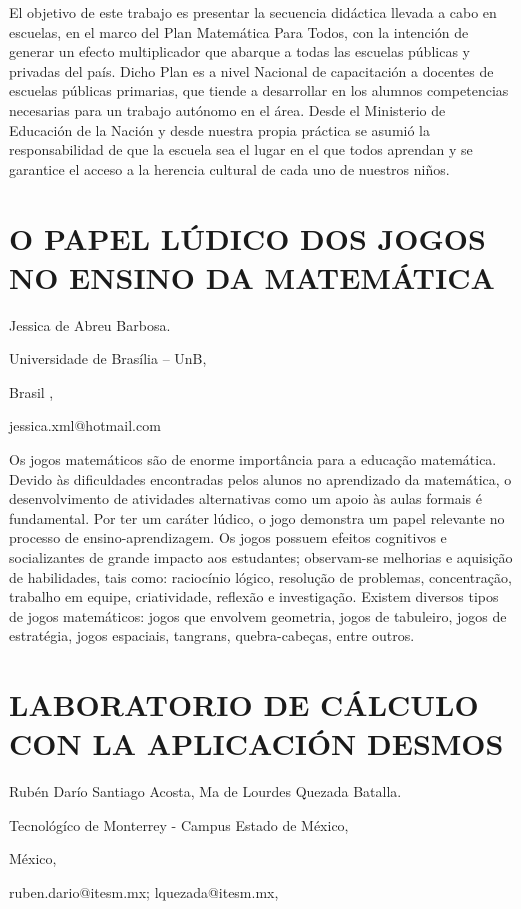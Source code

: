 El objetivo de este trabajo es presentar la secuencia didáctica llevada
a cabo en escuelas, en el marco del Plan Matemática Para Todos, con
la intención de generar un efecto multiplicador que abarque a todas
las escuelas públicas y privadas del país. Dicho Plan es a nivel Nacional
de capacitación a docentes de escuelas públicas primarias, que tiende
a desarrollar en los alumnos competencias necesarias para un trabajo
autónomo en el área. Desde el Ministerio de Educación de la Nación
y desde nuestra propia práctica se asumió la responsabilidad de que
la escuela sea el lugar en el que todos aprendan y se garantice el
acceso a la herencia cultural de cada uno de nuestros niños. 


\section{O PAPEL LÚDICO DOS JOGOS NO ENSINO DA MATEMÁTICA}

\begin{datos}

Jessica de Abreu Barbosa.

Universidade de Brasília – UnB,

Brasil ,

jessica.xml@hotmail.com

\end{datos}

Os jogos matemáticos são de enorme importância para a educação matemática.
Devido às dificuldades encontradas pelos alunos no aprendizado da
matemática, o desenvolvimento de atividades alternativas como um apoio
às aulas formais é fundamental. Por ter um caráter lúdico, o jogo
demonstra um papel relevante no processo de ensino-aprendizagem. Os
jogos possuem efeitos cognitivos e socializantes de grande impacto
aos estudantes; observam-se melhorias e aquisição de habilidades,
tais como: raciocínio lógico, resolução de problemas, concentração,
trabalho em equipe, criatividade, reflexão e investigação. Existem
diversos tipos de jogos matemáticos: jogos que envolvem geometria,
jogos de tabuleiro, jogos de estratégia, jogos espaciais, tangrans,
quebra-cabeças, entre outros. 


\section{LABORATORIO DE CÁLCULO CON LA APLICACIÓN DESMOS}

\begin{datos}

Rubén Darío Santiago Acosta, Ma de Lourdes Quezada Batalla.

Tecnológíco de Monterrey - Campus Estado de México,

México,

ruben.dario@itesm.mx; lquezada@itesm.mx, 

\end{datos}

